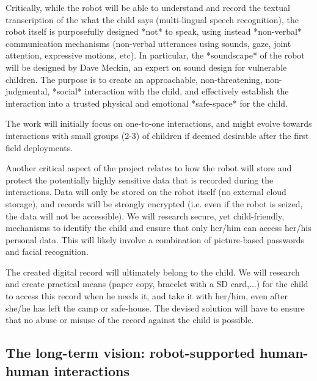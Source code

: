 \documentclass[11pt]{report}
\begin{document}
Critically, while the robot will be able to understand and record the textual
transcription of the what the child says (multi-lingual speech recognition),
the robot itself is purposefully designed *not* to speak, using instead *non-verbal*
communication mechanisms (non-verbal utterances using sounds, gaze, joint
attention, expressive motions, etc). In particular, the *soundscape* of the
robot will be designed by Dave Meckin, an expert on sound design for vulnerable
children. The purpose is to create an approachable, non-threatening,
non-judgmental, *social* interaction with the child, and effectively establish
the interaction into a trusted physical and emotional *safe-space* for the
child.

The work will initially focus on one-to-one interactions, and might evolve
towards interactions with small groups (2-3) of children if deemed desirable
after the first field deployments.

Another critical aspect of the project relates to how the robot will store and
protect the potentially highly sensitive data that is recorded during the
interactions. Data will only be stored on the robot itself (no external cloud
storage), and records will be strongly encrypted (i.e. even if the robot is
seized, the data will not be accessible). We will research secure, yet
child-friendly, mechanisms to identify the child and ensure that only her/him
can access her/his personal data. This will likely involve a combination of
picture-based passwords and facial recognition.

The created digital record will ultimately belong to the child. We will research
and create practical means (paper copy, bracelet with a SD card,...) for the
child to access this record when he needs it, and take it with her/him, even
after she/he has left the camp or safe-house. The devised solution will have to
ensure that no abuse or misuse of the record against the child is possible.



\subsection{The long-term vision: robot-supported human-human interactions}
\end{document}
